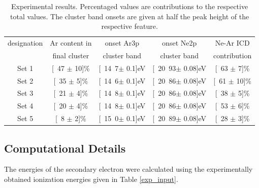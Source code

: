 \begin{table}[!h]                                                                                                                                       
 \centering                                                                                                                                      
 \caption{Experimental results. Percentaged values are contributions to the
          respective total values. The cluster band onsets are given
          at half the peak height of the respective feature.}
   \begin{tabular}{c c c c c}                                                                                                              
           \toprule
            designation    &       Ar content in   & onset Ar3p                    & onset Ne2p            & Ne-Ar ICD     \\
                                           &       final cluster   &   cluster band                & cluster band          & contribution  \\
           \midrule
           Set 1   &       \unit[47 $\pm$ 10]{\%}  &       \unit[14.7$\pm$ 0.1]{eV}        &       \unit[20.93$\pm$ 0.08]{eV}      &       \unit[63 $\pm$ 7]{\%}   \\
           Set 2   &       \unit[35 $\pm$ 5]{\%}   &       \unit[14.6$\pm$ 0.1]{eV}        &       \unit[20.86$\pm$ 0.08]{eV}      &       \unit[61 $\pm$ 10]{\%}  \\
           Set 3   &       \unit[21 $\pm$ 4]{\%}   &       \unit[14.8$\pm$ 0.1]{eV}        &       \unit[20.86$\pm$ 0.08]{eV}      &       \unit[38 $\pm$ 5]{\%}    \\
           Set 4   &       \unit[20 $\pm$ 4]{\%}   &       \unit[14.8$\pm$ 0.1]{eV}        &       \unit[20.86$\pm$ 0.08]{eV}      &       \unit[53 $\pm$ 6]{\%}    \\
           Set 5   &       \unit[8 $\pm$ 2]{\%}    &       \unit[15.0$\pm$ 0.1]{eV}        &       \unit[20.89$\pm$ 0.08]{eV}      &       \unit[28 $\pm$ 3]{\%}    \\
           \bottomrule
   \end{tabular}
\label{table:clustervalues}                                    
\end{table}




\subsection{Computational Details}
The energies of the secondary electron were calculated using the
experimentally obtained ionization energies given in Table \ref{exp_input}.

